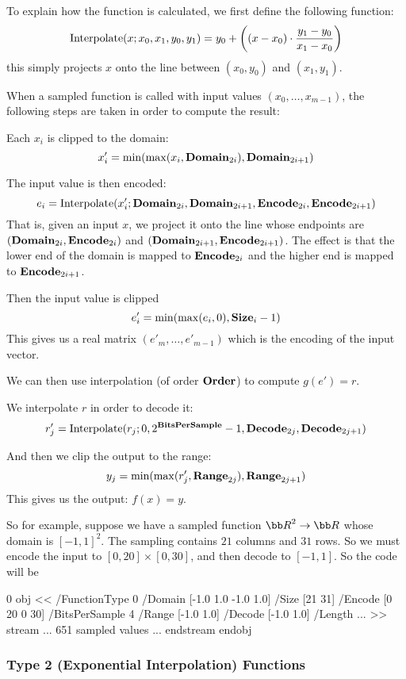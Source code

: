 To explain how the function is calculated, we first define the following function:
$$ \mathop{\rm Interpolate}(x;x_0,x_1,y_0,y_1) = y_0 + \left((x-x_0)\cdot{{y_1-y_0}\over{x_1-x_0}}\right) $$
this simply projects $x$ onto the line between $(x_0,y_0)$ and $(x_1,y_1)$.

When a sampled function is called with input values $(x_0,\dots,x_{m-1})$, the following steps are taken in
order to compute the result:
\benum
    \item Each $x_i$ is clipped to the domain:
        $$ x'_i = \min(\max(x_i,{\bf Domain}_{2i}),{\bf Domain}_{2i+1}) $$
    \item The input value is then encoded:
        $$ e_i = \mathop{\rm Interpolate}(x'_i;{\bf Domain}_{2i},{\bf Domain}_{2i+1},{\bf Encode}_{2i},{\bf Encode}_{2i+1}) $$
        That is, given an input $x$, we project it onto the line whose endpoints are
        $({\bf Domain}_{2i},{\bf Encode}_{2i})$ and $({\bf Domain}_{2i+1},{\bf Encode}_{2i+1})$.
        The effect is that the lower end of the domain is mapped to ${\bf Encode}_{2i}$ and the higher end
        is mapped to ${\bf Encode}_{2i+1}$.
    \item Then the input value is clipped
        $$ e'_i = \min(\max(e_i,0),{\bf Size}_i-1) $$
        This gives us a real matrix $(e'_m,\dots,e'_{m-1})$ which is the encoding of the input vector.
    \item We can then use interpolation (of order ${\bf Order}$) to compute $g(e')=r$.
    \item We interpolate $r$ in order to decode it:
        $$ r'_j = \mathop{\rm Interpolate}(r_j;0,2^{\bf BitsPerSample}-1,{\bf Decode}_{2j},{\bf Decode}_{2j+1}) $$
    \item And then we clip the output to the range:
        $$ y_j = \min(\max(r'_j,{\bf Range}_{2j}),{\bf Range}_{2j+1}) $$
        This gives us the output: $f(x)=y$.
\eenum

So for example, suppose we have a sampled function ${\bb R}^2\to{\bb R}$ whose domain is $[-1,1]^2$.
The sampling contains $21$ columns and $31$ rows.
So we must encode the input to $[0,20]\times[0,30]$, and then decode to $[-1,1]$.
So the code will be

 0 obj
<<
    /FunctionType 0
    /Domain [-1.0 1.0 -1.0 1.0]
    /Size [21 31]
    /Encode [0 20 0 30]
    /BitsPerSample 4
    /Range [-1.0 1.0]
    /Decode [-1.0 1.0]
    /Length ...
>>
stream
... 651 sampled values ...
endstream
endobj
\elisting

\subsubsection{Type 2 (Exponential Interpolation) Functions}

